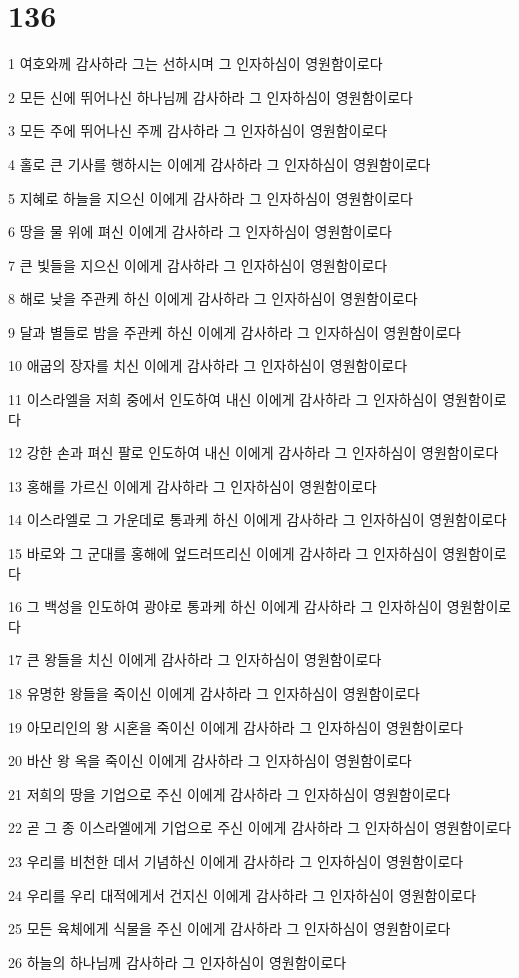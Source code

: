 \chapter{136}

\par 1 여호와께 감사하라 그는 선하시며 그 인자하심이 영원함이로다
\par 2 모든 신에 뛰어나신 하나님께 감사하라 그 인자하심이 영원함이로다
\par 3 모든 주에 뛰어나신 주께 감사하라 그 인자하심이 영원함이로다
\par 4 홀로 큰 기사를 행하시는 이에게 감사하라 그 인자하심이 영원함이로다
\par 5 지혜로 하늘을 지으신 이에게 감사하라 그 인자하심이 영원함이로다
\par 6 땅을 물 위에 펴신 이에게 감사하라 그 인자하심이 영원함이로다
\par 7 큰 빛들을 지으신 이에게 감사하라 그 인자하심이 영원함이로다
\par 8 해로 낮을 주관케 하신 이에게 감사하라 그 인자하심이 영원함이로다
\par 9 달과 별들로 밤을 주관케 하신 이에게 감사하라 그 인자하심이 영원함이로다
\par 10 애굽의 장자를 치신 이에게 감사하라 그 인자하심이 영원함이로다
\par 11 이스라엘을 저희 중에서 인도하여 내신 이에게 감사하라 그 인자하심이 영원함이로다
\par 12 강한 손과 펴신 팔로 인도하여 내신 이에게 감사하라 그 인자하심이 영원함이로다
\par 13 홍해를 가르신 이에게 감사하라 그 인자하심이 영원함이로다
\par 14 이스라엘로 그 가운데로 통과케 하신 이에게 감사하라 그 인자하심이 영원함이로다
\par 15 바로와 그 군대를 홍해에 엎드러뜨리신 이에게 감사하라 그 인자하심이 영원함이로다
\par 16 그 백성을 인도하여 광야로 통과케 하신 이에게 감사하라 그 인자하심이 영원함이로다
\par 17 큰 왕들을 치신 이에게 감사하라 그 인자하심이 영원함이로다
\par 18 유명한 왕들을 죽이신 이에게 감사하라 그 인자하심이 영원함이로다
\par 19 아모리인의 왕 시혼을 죽이신 이에게 감사하라 그 인자하심이 영원함이로다
\par 20 바산 왕 옥을 죽이신 이에게 감사하라 그 인자하심이 영원함이로다
\par 21 저희의 땅을 기업으로 주신 이에게 감사하라 그 인자하심이 영원함이로다
\par 22 곧 그 종 이스라엘에게 기업으로 주신 이에게 감사하라 그 인자하심이 영원함이로다
\par 23 우리를 비천한 데서 기념하신 이에게 감사하라 그 인자하심이 영원함이로다
\par 24 우리를 우리 대적에게서 건지신 이에게 감사하라 그 인자하심이 영원함이로다
\par 25 모든 육체에게 식물을 주신 이에게 감사하라 그 인자하심이 영원함이로다
\par 26 하늘의 하나님께 감사하라 그 인자하심이 영원함이로다

